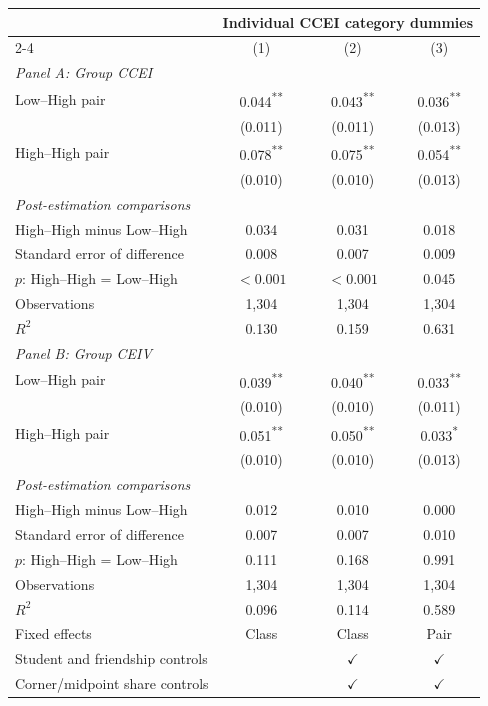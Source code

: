 
\begin{tabular}{lccc}
\toprule
& \multicolumn{3}{c}{Individual CCEI category dummies}\\
\cmidrule(lr){2-4}
& (1) & (2) & (3)\\
\midrule
\multicolumn{4}{l}{\textit{Panel A: Group CCEI}}\\[3pt]
Low--High pair & 0.044\textsuperscript{**} & 0.043\textsuperscript{**} & 0.036\textsuperscript{**}\\
 & (0.011) & (0.011) & (0.013)\\
High--High pair & 0.078\textsuperscript{**} & 0.075\textsuperscript{**} & 0.054\textsuperscript{**}\\
 & (0.010) & (0.010) & (0.013)\\
\midrule\multicolumn{4}{l}{\textit{Post-estimation comparisons}}\\[2pt]
High--High minus Low--High & 0.034 & 0.031 & 0.018\\
Standard error of difference & 0.008 & 0.007 & 0.009\\
$p$: High--High = Low--High & $<0.001$ & $<0.001$ & 0.045\\
\addlinespace
Observations & 1,304 & 1,304 & 1,304\\
$R^2$ & 0.130 & 0.159 & 0.631\\
\midrule
\multicolumn{4}{l}{\textit{Panel B: Group CEIV}}\\[3pt]
Low--High pair & 0.039\textsuperscript{**} & 0.040\textsuperscript{**} & 0.033\textsuperscript{**}\\
 & (0.010) & (0.010) & (0.011)\\
High--High pair & 0.051\textsuperscript{**} & 0.050\textsuperscript{**} & 0.033\textsuperscript{*}\\
 & (0.010) & (0.010) & (0.013)\\
\midrule\multicolumn{4}{l}{\textit{Post-estimation comparisons}}\\[2pt]
High--High minus Low--High & 0.012 & 0.010 & 0.000\\
Standard error of difference & 0.007 & 0.007 & 0.010\\
$p$: High--High = Low--High & 0.111 & 0.168 & 0.991\\
\addlinespace
Observations & 1,304 & 1,304 & 1,304\\
$R^2$ & 0.096 & 0.114 & 0.589\\
\midrule
Fixed effects & Class & Class & Pair\\
Student and friendship controls &  & $\checkmark$ & $\checkmark$\\
Corner/midpoint share controls &  & $\checkmark$ & $\checkmark$\\
\bottomrule
\end{tabular}
